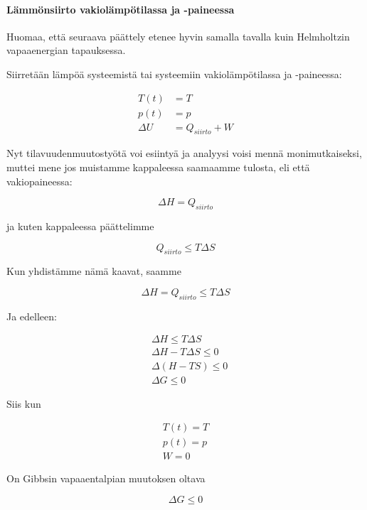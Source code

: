 \documentclass[12pt,a4paper,finnish]{book}
\begin{document}
\paragraph{Lämmönsiirto vakiolämpötilassa ja -paineessa}

Huomaa, että seuraava päättely etenee hyvin samalla tavalla kuin Helmholtzin vapaaenergian tapauksessa.

Siirretään lämpöä systeemistä tai systeemiin vakiolämpötilassa ja -paineessa:

\begin{align}
 T(t) & = T\\
 p(t) & = p\\
 \Delta U & = Q_{siirto} + W
\end{align}

Nyt tilavuudenmuutostyötä voi esiintyä ja analyysi voisi mennä monimutkaiseksi, muttei mene jos muistamme 
kappaleessa  saamaamme tulosta, eli että vakiopaineessa:

\begin{equation}
 \Delta H = Q_{siirto}
\end{equation}

ja kuten kappaleessa  päättelimme

\begin{equation}
 Q_{siirto} \leq T \Delta S
\end{equation}

Kun yhdistämme nämä kaavat, saamme

\begin{equation}
 \Delta H = Q_{siirto} \leq T\Delta S
\end{equation}

Ja edelleen: 

\begin{align}
 & \Delta H \leq T\Delta S\\
 & \Delta H - T\Delta S \leq 0\\
 & \Delta(H - TS) \leq 0\\
 & \Delta G \leq 0
\end{align}

Siis kun

\begin{align}
 T(t) = T\\
 p(t) = p\\
 W = 0
\end{align}

On Gibbsin vapaaentalpian muutoksen oltava

\begin{equation}
 \Delta G \leq 0
\end{equation}
\end{document}
